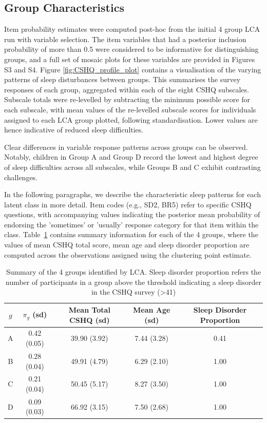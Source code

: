 \documentclass[11pt]{article}
\theoremstyle{plain}
\theoremstyle{definition}
\begin{document}
\subsection{Group Characteristics}
Item probability estimates were computed post-hoc from the initial 4 group LCA run with variable selection. The item variables that had a posterior inclusion probability of more than 0.5 were considered to be informative for distinguishing groups, and a full set of mosaic plots for these variables are provided in Figures S3 and S4. Figure \ref{fig:CSHQ_profile_plot} contains a visualisation of the varying patterns of sleep disturbances between groups. This summarises the survey responses of each group, aggregated within each of the eight CSHQ subscales. Subscale totals were re-levelled by subtracting the minimum possible score for each subscale, with mean values of the re-levelled subscale scores for individuals assigned to each LCA group plotted, following standardisation. Lower values are hence indicative of reduced sleep difficulties. 

Clear differences in variable response patterns across groups can be observed. Notably, children in Group A and Group D record the lowest and highest degree of sleep difficulties across all subscales, while Groups B and C exhibit contrasting challenges.  

In the following paragraphs, we describe the characteristic sleep patterns for each latent class in more detail. Item codes (e.g., SD2, BR5) refer to specific CSHQ questions, with accompanying values indicating the posterior mean probability of endorsing the 'sometimes' or 'usually' response category for that item within the class. Table~\ref{table:groups_summary_table} contains summary information for each of the 4 groups, where the values of mean CSHQ total score, mean age and sleep disorder proportion are computed across the observations assigned using the clustering point estimate. 
\begin{table}%
\begin{center}
\begin{tabular}{ccccc}
    \hline
    $g$ & $\pi_g$ (sd) & Mean Total CSHQ (sd) & Mean Age (sd) & Sleep Disorder Proportion \\
    \hline
    A & 0.42 (0.05) & 39.90 (3.92) & 7.44 (3.28) &  0.41 \\
    B & 0.28 (0.04) & 49.91 (4.79) & 6.29 (2.10) &  1.00 \\
    C & 0.21 (0.04) & 50.45 (5.17) & 8.27 (3.50) &  1.00 \\
    D & 0.09 (0.03) & 66.92 (3.15) & 7.50 (2.68) &  1.00 \\
    \hline                                            
\end{tabular}            
\caption{Summary of the 4 groups identified by LCA. Sleep disorder proportion refers the number of participants in a group above the threshold indicating a sleep disorder in the CSHQ survey (>41)}\label{table:groups_summary_table}
\end{center}
\end{table}
\end{document}
